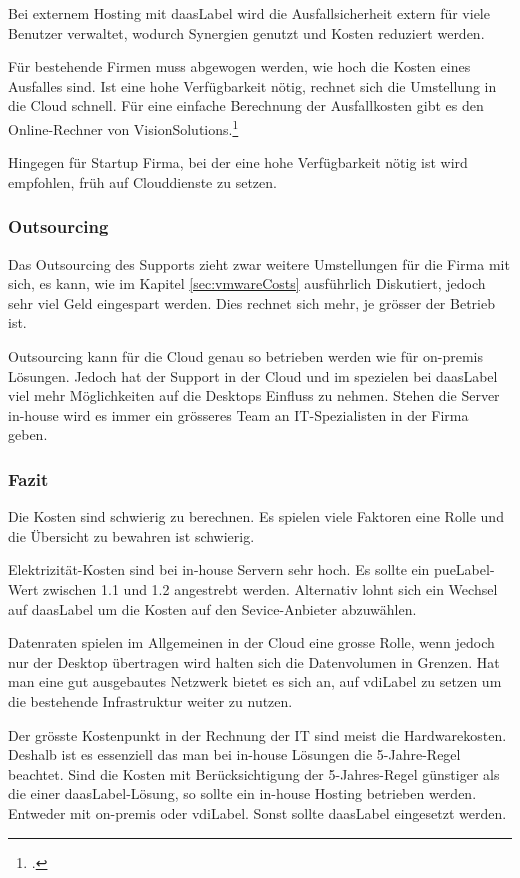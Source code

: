 Bei externem Hosting mit \Gls{daasLabel} wird die Ausfallsicherheit extern für viele Benutzer verwaltet, wodurch Synergien genutzt und Kosten reduziert werden.

Für bestehende Firmen muss abgewogen werden, wie hoch die Kosten eines Ausfalles sind. Ist eine hohe Verfügbarkeit nötig, rechnet sich die Umstellung in die Cloud schnell. Für eine einfache Berechnung der Ausfallkosten gibt es den Online-Rechner von VisionSolutions.\footcite{Disaster_Recovery_Resouce_Center_-_Vision_Solutions}

Hingegen für Startup Firma, bei der eine hohe Verfügbarkeit nötig ist wird empfohlen, früh auf Clouddienste zu setzen.

\subsubsection{Outsourcing}
Das Outsourcing des Supports zieht zwar weitere Umstellungen für die Firma mit sich, es kann, wie im Kapitel \cref{sec:vmwareCosts} ausführlich Diskutiert, jedoch sehr viel Geld eingespart werden. Dies rechnet sich mehr, je grösser der Betrieb ist.

Outsourcing kann für die Cloud genau so betrieben werden wie für on-premis Lösungen. Jedoch hat der Support in der Cloud und im spezielen bei \Gls{daasLabel} viel mehr Möglichkeiten auf die Desktops Einfluss zu nehmen. Stehen die Server in-house wird es immer ein grösseres Team an IT-Spezialisten in der Firma geben.

\subsubsection{Fazit}
Die Kosten sind schwierig zu berechnen. Es spielen viele Faktoren eine Rolle und die Übersicht zu bewahren ist schwierig.

Elektrizität-Kosten sind bei in-house Servern sehr hoch. Es sollte ein \Gls{pueLabel}-Wert zwischen 1.1 und 1.2 angestrebt werden. Alternativ lohnt sich ein Wechsel auf \Gls{daasLabel} um die Kosten auf den Sevice-Anbieter abzuwählen.

Datenraten spielen im Allgemeinen in der Cloud eine grosse Rolle, wenn jedoch nur der Desktop übertragen wird halten sich die Datenvolumen in Grenzen. Hat man eine gut ausgebautes Netzwerk bietet es sich an, auf \Gls{vdiLabel} zu setzen um die bestehende Infrastruktur weiter zu nutzen.

Der grösste Kostenpunkt in der Rechnung der IT sind meist die Hardwarekosten. Deshalb ist es essenziell das man bei in-house Lösungen die 5-Jahre-Regel beachtet. Sind die Kosten mit Berücksichtigung der 5-Jahres-Regel günstiger als die einer \Gls{daasLabel}-Lösung, so sollte ein in-house Hosting betrieben werden. Entweder mit on-premis oder \Gls{vdiLabel}. Sonst sollte \Gls{daasLabel} eingesetzt werden.

